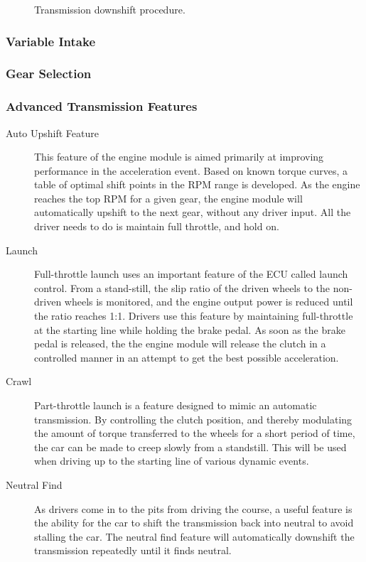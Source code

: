 \begin{figure}[H]
\centering

\caption{Transmission downshift procedure.}
\label{fig:transmission_downshift_flow}
\end{figure}

\subsubsection{Variable Intake}


\subsubsection{Gear Selection \label{sec:design_engine_transmission_gear_selection}}


\subsubsection{Advanced Transmission Features}

\begin{description}

\item[Auto Upshift Feature]

This feature of the engine module is aimed primarily at improving performance in the acceleration event. Based on known torque curves, a table of optimal shift points in the RPM range is developed. As the engine reaches the top RPM for a given gear, the engine module will automatically upshift to the next gear, without any driver input. All the driver needs to do is maintain full throttle, and hold on.

\item[Launch]
Full-throttle launch uses an important feature of the ECU called launch control. From a stand-still, the slip ratio of the driven wheels to the non-driven wheels is monitored, and the engine output power is reduced until the ratio reaches 1:1. Drivers use this feature by maintaining full-throttle at the starting line while holding the brake pedal. As soon as the brake pedal is released, the the engine module will release the clutch in a controlled manner in an attempt to get the best possible acceleration.

\item[Crawl]
Part-throttle launch is a feature designed to mimic an automatic transmission. By controlling the clutch position, and thereby modulating the amount of torque transferred to the wheels for a short period of time, the car can be made to creep slowly from a standstill. This will be used when driving up to the starting line of various dynamic events.

\item[Neutral Find]
As drivers come in to the pits from driving the course, a useful feature is the ability for the car to shift the transmission back into neutral to avoid stalling the car. The neutral find feature will automatically downshift the transmission repeatedly until it finds neutral.

\end{description}



